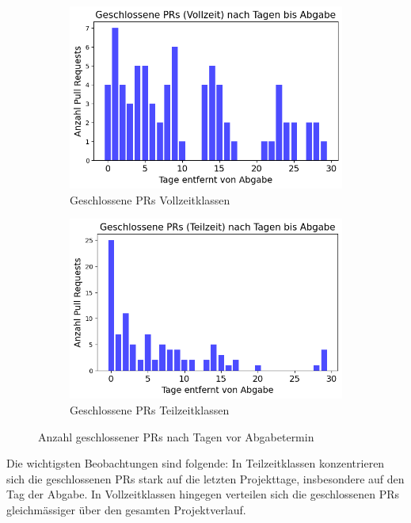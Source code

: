 \begin{figure}[htbp] 
\centering \begin{subfigure}[b]{0.48\textwidth} 
\centering \includegraphics[width=\textwidth]{Figures/closed-prs-projektzeit-vollzeit.png} 
\caption{Geschlossene PRs Vollzeitklassen} 
\label{fig:closed-prs-projektkeit-vollzeit}
\end{subfigure} 
\hfill 
\begin{subfigure}[b]{0.48\textwidth} 
\centering \includegraphics[width=\textwidth]{Figures/closed-prs-projektzeit-teilzeit.png} 
\caption{Geschlossene PRs Teilzeitklassen} 
\label{fig:closed-prs-projektkeit-teilzeit} 
\end{subfigure} 
\caption{Anzahl geschlossener PRs nach Tagen vor Abgabetermin} 
\label{fig:closed-prs-projektzeit} 
\end{figure}

Die wichtigsten Beobachtungen sind folgende: In Teilzeitklassen konzentrieren sich die geschlossenen PRs stark auf die letzten Projekttage, insbesondere auf den Tag der Abgabe. In Vollzeitklassen hingegen verteilen sich die geschlossenen PRs gleichmässiger über den gesamten Projektverlauf.


